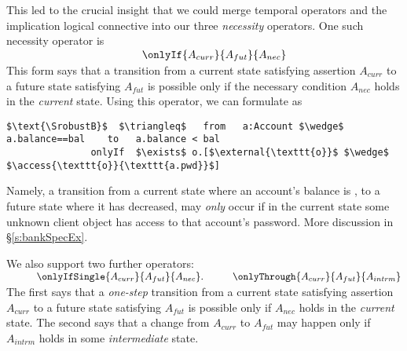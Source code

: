   
  {This led to the  crucial insight that we could merge  temporal operators and the implication 
 logical connective into our three}
   \emph{necessity} operators. 
 One such necessity operator is \\
$ 
\strut \hspace{1.7in} \onlyIf {A_{curr}} {A_{fut}} {A_{nec}}
$  
\\
This form says that  
a  {transition} from a current state satisfying assertion $A_{curr}$ to a future
state satisfying $A_{fut}$  is possible only if  the   necessary 
condition
$A_{nec}$ holds in the \emph{current} state.
Using this operator, we can formulate  \SrobustB  
as
\begin{lstlisting}[language = Chainmail, mathescape=true, frame=lines]
   $\text{\SrobustB}$  $\triangleq$   from   a:Account $\wedge$ a.balance==bal    to   a.balance < bal
               onlyIf  $\exists$ o.[$\external{\texttt{o}}$ $\wedge$ $\access{\texttt{o}}{\texttt{a.pwd}}$]
\end{lstlisting}
Namely, a transition from a  {current} state where an account's balance is , to a  {future} state where 
it has decreased, may \emph{only} occur if  {in the current state} some unknown client object  
has access to that account's password. 
More discussion in \S\ref{s:bankSpecEx}. 


We also support two further \Nec operators:
\\
$ 
\strut \hspace{.4in} \onlyIfSingle {A_{curr}} {A_{fut}} {A_{nec}}. \strut \hspace{.4in} \onlyThrough {A_{curr}} {A_{fut}} {A_{intrm}}
$ 
\\
{The  first says    that 
a  \emph{one-step} {transition} from a current state satisfying assertion $A_{curr}$ to a future
state satisfying $A_{fut}$  
is possible only if %
$A_{nec}$ holds in the \emph{current} state.   
The   second says that a change from %
 $A_{curr}$ to  $A_{fut}$  may happen only if %
 $A_{intrm}$ holds in some \emph{intermediate} state.}
 
